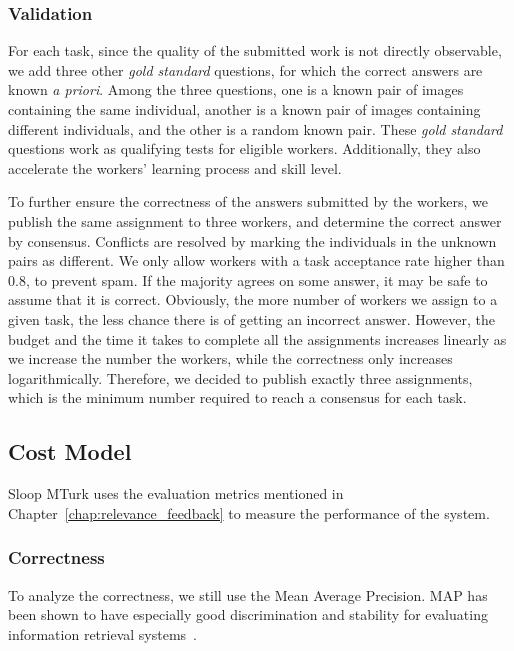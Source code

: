   \subsubsection{Validation}
  \label{subsub:validation} %

  For each task, since the quality of the submitted work is not directly
  observable, we add three other \emph{gold standard} questions, for which the
  correct answers are known \emph{a priori}. Among the three questions, one is a known
  pair of images containing the same individual, another is a known pair of
  images containing different individuals, and the other is a random known pair.
  These \emph{gold standard} questions work as qualifying tests for eligible
  workers. Additionally, they also accelerate the workers' learning process and
  skill level.

  To further ensure the correctness of the answers submitted by the workers, we
  publish the same assignment to three workers, and determine the correct answer
  by consensus. Conflicts are resolved by marking the individuals in the unknown
  pairs as different. We only allow workers with a task acceptance rate higher than
  0.8, to prevent spam. If the majority agrees on some answer, it may be safe to
  assume that it is correct. Obviously, the more number of workers we assign to a
  given task, the less chance there is of getting an incorrect answer. However,
  the budget and the time it takes to complete all the assignments increases
  linearly as we increase the number the workers, while the
  correctness only increases logarithmically. Therefore, we decided to publish
  exactly three assignments, which is the minimum number required to reach a consensus
  for each task.

  \subsection{Cost Model}

  Sloop MTurk uses the evaluation metrics mentioned in
  Chapter~\ref{chap:relevance_feedback} to measure the performance of the system.

  \subsubsection{Correctness}

  To analyze the correctness, we still use the Mean Average Precision.  MAP has
  been shown to have especially good discrimination and stability for evaluating
  information retrieval
  systems~\cite{manning2008introduction}.

